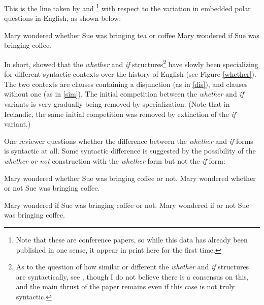 \documentclass{artikel3}
\begin{document}
This is the line taken by \citet{baileywallenbergwurff2012} and \citet{fruehwaldwallenberg2013}\footnote{Note that these are conference papers, so while this data has already been published in one sense, it appear in print here for the first time.} with respect to the variation in embedded polar questions in English, as shown below:

\begin{exe}
    \ex \label{dis} Mary wondered whether Sue was bringing tea or coffee
    \ex \label{sim} Mary wondered if Sue was bringing coffee.
\end{exe}

In short, \citet{baileywallenbergwurff2012} showed that the \textsl{whether} and \textsl{if} structures\footnote{As to the question of how similar or different the \textsl{whether} and \textsl{if} structures are syntactically, see \citet{larson1985}, though I do not believe there is a consensus on this, and the main thrust of the paper remains even if this case is not truly syntactic.} have slowly been specializing for different syntactic contexts over the history of English (see Figure \ref{whether}). The two contexts are clauses containing a disjunction (as in \ref{dis}), and clauses without one (as in \ref{sim}). The initial competition between the \textsl{whether} and \textsl{if} variants is very gradually being removed by specialization. (Note that in Icelandic, the same initial competition was removed by extinction of the \textsl{if} variant.) 

One reviewer questions whether the difference between the \textsl{whether} and \textsl{if} forms is syntactic at all. Some syntactic difference is suggested by the possibility of the \textsl{whether or not} construction with the \textsl{whether} form but not the \textsl{if} form:

\begin{exe}
    \ex \begin{xlist}
         \ex Mary wondered whether Sue was bringing coffee or not.
         \ex Mary wondered whether or not Sue was bringing coffee.
         \end{xlist}

    \ex \begin{xlist}
         \ex Mary wondered if Sue was bringing coffee or not.
         \ex * Mary wondered if or not Sue was bringing coffee.
         \end{xlist}
\end{exe}
\end{document}
